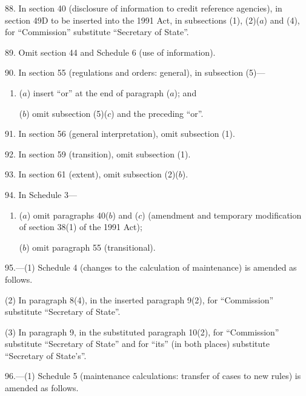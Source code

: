 \documentclass[12pt,a4paper]{article}
\begin{document}
\medskip

88.  In section 40 (disclosure of information to credit reference agencies), in section 49D to be inserted into the 1991 Act, in subsections (1), (2)($a$)  and (4), for “Commission” substitute “Secretary of State”.

\medskip

89.  Omit section 44 and Schedule 6 (use of information).

\medskip

90.  In section 55 (regulations and orders: general), in subsection (5)—
\begin{enumerate}\item[]
($a$) insert “or” at the end of paragraph ($a$); and

($b$) omit subsection (5)($c$)  and the preceding “or”.
\end{enumerate}

\medskip

91.  In section 56 (general interpretation), omit subsection (1).

\medskip

92.  In section 59 (transition), omit subsection (1).

\medskip

93.  In section 61 (extent), omit subsection (2)($b$).

\medskip

94.  In Schedule 3—
\begin{enumerate}\item[]
($a$) omit paragraphs 40($b$)  and ($c$)  (amendment and temporary modification of section 38(1) of the 1991 Act);

($b$) omit paragraph 55 (transitional).
\end{enumerate}

\medskip

95.---(1)  Schedule 4 (changes to the calculation of maintenance) is amended as follows.

(2) In paragraph 8(4), in the inserted paragraph 9(2), for “Commission” substitute “Secretary of State”.

(3) In paragraph 9, in the substituted paragraph 10(2), for “Commission” substitute “Secretary of State” and for “its” (in both places) substitute “Secretary of State’s”.

\medskip

96.---(1)  Schedule 5 (maintenance calculations: transfer of cases to new rules) is amended as follows.
\end{document}

